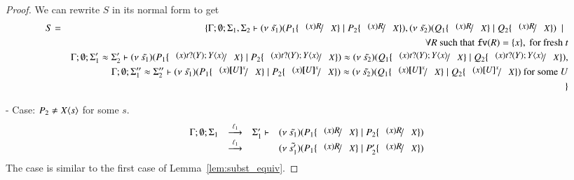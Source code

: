 \begin{proof}
	We can rewrite $S$ in its normal form to get
	\begin{eqnarray*}
		S &=& \set{ \Gamma; \es; \Sigma_1, \Sigma_2 \proves \newsp{\tilde{s_1}}{P_1 \subst{(x) R}{X} \Par P_2 \subst{(x) R}{X}}, \newsp{\tilde{s_2}}{Q_1 \subst{(x) R}{X} \Par Q_2 \subst{(x) R}{X}} \setbar \\
		&& \forall R \textrm{ such that } \fv{R} = \set{x}, \textrm{ for fresh } t\\
		&& \Gamma; \es; \Sigma_1' \wb \Sigma_2' \proves \newsp{\tilde{s_1}}{P_1 \subst{(x) \binp{t}{Y} \appl{Y}{x}}{X} \Par P_2 \subst{(x) \binp{t}{Y} \appl{Y}{x}}{X}} \wb \newsp{\tilde{s_2}}{Q_1 \subst{(x) \binp{t}{Y} \appl{Y}{x}}{X} \Par Q_2 \subst{(x) \binp{t}{Y} \appl{Y}{x}}{X}}, \\
		&& \Gamma; \es; \Sigma_1'' \wb \Sigma_2'' \proves \newsp{\tilde{s_1}}{P_1 \subst{(x) \map{U}^x}{X} \Par P_2 \subst{(x) \map{U}^x}{X}} \wb \newsp{\tilde{s_2}}{Q_1 \subst{(x) \map{U}^x}{X} \Par Q_2 \subst{(x) \map{U}^x}{X}} \textrm{ for some } U \\
		&&}
	\end{eqnarray*}

	\noi - Case: $P_2 \not= X\langle s \rangle$ for some $s$.
%
	\[
	\begin{array}{rcll}
		\Gamma; \es; \Sigma_1 &\by{\ell_1}& \Sigma_1' \proves& \newsp{\tilde{s_1}}{P_1 \subst{(x) R}{X} \Par P_2 \subst{(x) R}{X}}\\
		&\by{\ell_1} & & \newsp{\tilde{s_1'}}{P_1 \subst{(x) R}{X} \Par P_2' \subst{(x) R}{X}}
	\end{array}
	\]
%
	\noi The case is similar to the first case of Lemma~\ref{lem:subst_equiv}.


\end{proof}
